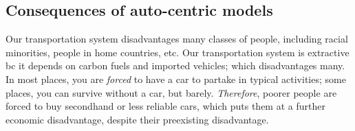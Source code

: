 \documentclass{article}
\begin{document}
    \subsection{Consequences of auto-centric models}
    \begin{outline}
        \1 Our transportation system disadvantages many classes of people, including racial minorities, people in home countries, etc. 
        \1 Our transportation system is extractive bc it depends on carbon fuels and imported vehicles; which disadvantages many. 
        \1 In most places, you are \textit{forced} to have a car to partake in typical activities; some places, you can survive without a car, but barely.
            \2 \textit{Therefore}, poorer people are forced to buy secondhand or less reliable cars, which puts them at a further economic disadvantage, despite their preexisting disadvantage. 
            
    \end{outline}
\end{document}
